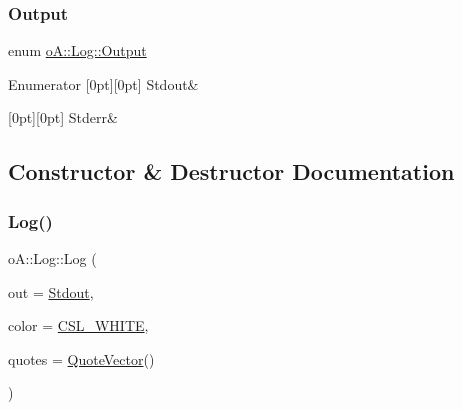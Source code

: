 \subsubsection{\texorpdfstring{Output}{Output}}
{\footnotesize\ttfamily enum \mbox{\hyperlink{classo_a_1_1_log_a640171dc239ea7befcd640362343f88f}{o\+A\+::\+Log\+::\+Output}}}

\begin{DoxyEnumFields}{Enumerator}
[0pt][0pt]{}\mbox{\label{classo_a_1_1_log_a640171dc239ea7befcd640362343f88fa6504dea4a3bf34c8734b664b6364a0d9}} 
Stdout&\\
\hline

[0pt][0pt]{}\mbox{\label{classo_a_1_1_log_a640171dc239ea7befcd640362343f88faa01279ed925a2480f04ad2d89bf1722a}} 
Stderr&\\
\hline

\end{DoxyEnumFields}


\subsection{Constructor \& Destructor Documentation}
\mbox{\label{classo_a_1_1_log_a8f57798a38bc53782107ee07f2f2caa5}} 
\subsubsection{\texorpdfstring{Log()}{Log()}\hspace{0.1cm}{\footnotesize\ttfamily [1/2]}}
{\footnotesize\ttfamily o\+A\+::\+Log\+::\+Log (\begin{DoxyParamCaption}\item[{\mbox{\hyperlink{classo_a_1_1_log_a640171dc239ea7befcd640362343f88f}{Output}}}]{out = {\ttfamily \mbox{\hyperlink{classo_a_1_1_log_a640171dc239ea7befcd640362343f88fa6504dea4a3bf34c8734b664b6364a0d9}{Stdout}}},  }\item[{const \mbox{\hyperlink{namespaceo_a_a747e07c1977a29f3e1d38683043ec927}{Console\+Color}} \&}]{color = {\ttfamily \mbox{\hyperlink{namespaceo_a_a4afb55957ed6dcda70e81d6dd8f07885}{C\+S\+L\+\_\+\+W\+H\+I\+TE}}},  }\item[{const \mbox{\hyperlink{namespaceo_a_a38695044d9ec0b57190f4e3fab0caffd}{Quote\+Vector}} \&}]{quotes = {\ttfamily \mbox{\hyperlink{namespaceo_a_a38695044d9ec0b57190f4e3fab0caffd}{Quote\+Vector}}()} }\end{DoxyParamCaption})}

